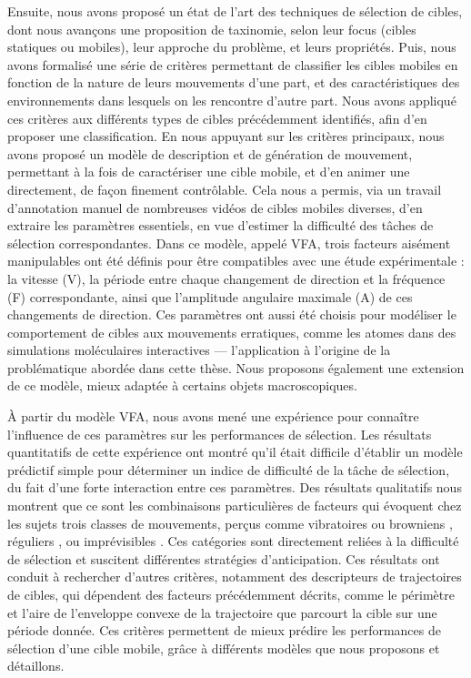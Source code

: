 	Ensuite, nous avons proposé un état de l'art des techniques de sélection de cibles, dont nous avançons une proposition de taxinomie, selon leur focus (cibles statiques ou mobiles), leur approche du problème, et leurs propriétés. Puis, nous avons formalisé une série de critères permettant de classifier les cibles mobiles en fonction de la nature de leurs mouvements d'une part, et des caractéristiques des environnements dans lesquels on les rencontre d'autre part. Nous avons appliqué ces critères aux différents types de cibles précédemment identifiés, afin d'en proposer une classification. En nous appuyant sur les critères principaux, nous avons proposé un modèle de description et de génération de mouvement, permettant à la fois de caractériser une cible mobile, et d'en animer une directement, de façon finement contrôlable. Cela nous a permis, via un travail d'annotation manuel de nombreuses vidéos de cibles mobiles diverses, d'en extraire les paramètres essentiels, en vue d'estimer la difficulté des tâches de sélection correspondantes. Dans ce modèle, appelé VFA, trois facteurs aisément manipulables ont été définis pour être compatibles avec une étude expérimentale : la vitesse (V), la période entre chaque changement de direction et la fréquence (F) correspondante, ainsi que l'amplitude angulaire maximale (A) de ces changements de direction. Ces paramètres ont aussi été choisis pour modéliser le comportement de cibles aux mouvements erratiques, comme les atomes dans des simulations moléculaires interactives --- l’application à l’origine de la problématique abordée dans cette thèse. Nous proposons également une extension de ce modèle, mieux adaptée à certains objets macroscopiques.

	À partir du modèle VFA, nous avons mené une expérience pour connaître l'influence de ces paramètres sur les performances de sélection. Les résultats quantitatifs de cette expérience ont montré qu'il était difficile d'établir un modèle prédictif simple pour déterminer un indice de difficulté de la tâche de sélection, du fait d'une forte interaction entre ces paramètres. Des résultats qualitatifs nous montrent que ce sont les combinaisons particulières de facteurs qui évoquent chez les sujets trois classes de mouvements, perçus comme \og vibratoires \fg{} ou \og browniens \fg{}, \og réguliers \fg{}, ou \og imprévisibles \fg{}. Ces catégories sont directement reliées à la difficulté de sélection et suscitent différentes stratégies d'anticipation. Ces résultats ont conduit à rechercher d'autres critères, notamment des descripteurs de trajectoires de cibles, qui dépendent des facteurs précédemment décrits, comme le périmètre et l'aire de l'enveloppe convexe de la trajectoire que parcourt la cible sur une période donnée. Ces critères permettent de mieux prédire les performances de sélection d'une cible mobile, grâce à différents modèles que nous proposons et détaillons.

